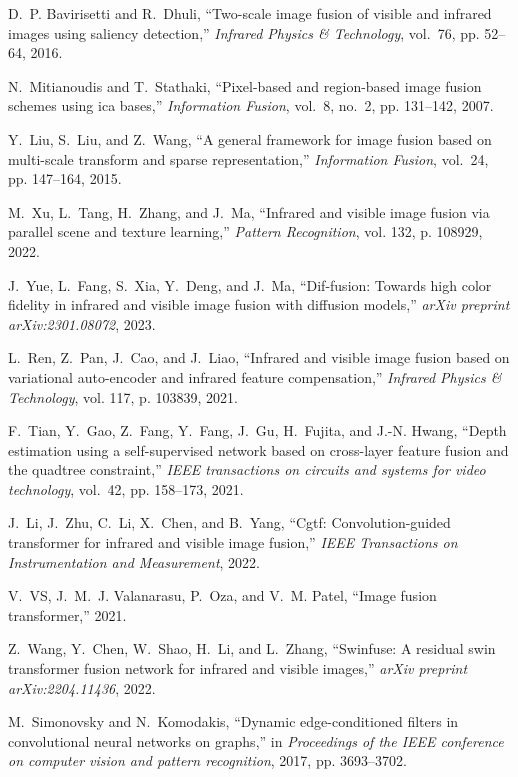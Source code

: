 \documentclass[journal]{IEEEtran}
\begin{document}
\begin{thebibliography}{10}
D.~P. Bavirisetti and R.~Dhuli, ``Two-scale image fusion of visible and
  infrared images using saliency detection,'' \emph{Infrared Physics \&
  Technology}, vol.~76, pp. 52--64, 2016.

N.~Mitianoudis and T.~Stathaki, ``Pixel-based and region-based image fusion
  schemes using ica bases,'' \emph{Information Fusion}, vol.~8, no.~2, pp.
  131--142, 2007.

Y.~Liu, S.~Liu, and Z.~Wang, ``A general framework for image fusion based on
  multi-scale transform and sparse representation,'' \emph{Information Fusion},
  vol.~24, pp. 147--164, 2015.

M.~Xu, L.~Tang, H.~Zhang, and J.~Ma, ``Infrared and visible image fusion via
  parallel scene and texture learning,'' \emph{Pattern Recognition}, vol. 132,
  p. 108929, 2022.

J.~Yue, L.~Fang, S.~Xia, Y.~Deng, and J.~Ma, ``Dif-fusion: Towards high color
  fidelity in infrared and visible image fusion with diffusion models,''
  \emph{arXiv preprint arXiv:2301.08072}, 2023.

L.~Ren, Z.~Pan, J.~Cao, and J.~Liao, ``Infrared and visible image fusion based
  on variational auto-encoder and infrared feature compensation,''
  \emph{Infrared Physics \& Technology}, vol. 117, p. 103839, 2021.

F.~Tian, Y.~Gao, Z.~Fang, Y.~Fang, J.~Gu, H.~Fujita, and J.-N. Hwang, ``Depth
  estimation using a self-supervised network based on cross-layer feature
  fusion and the quadtree constraint,'' \emph{IEEE transactions on circuits and
  systems for video technology}, vol.~42, pp. 158--173, 2021.

J.~Li, J.~Zhu, C.~Li, X.~Chen, and B.~Yang, ``Cgtf: Convolution-guided
  transformer for infrared and visible image fusion,'' \emph{IEEE Transactions
  on Instrumentation and Measurement}, 2022.

V.~VS, J.~M.~J. Valanarasu, P.~Oza, and V.~M. Patel, ``Image fusion
  transformer,'' 2021.

Z.~Wang, Y.~Chen, W.~Shao, H.~Li, and L.~Zhang, ``Swinfuse: A residual swin
  transformer fusion network for infrared and visible images,'' \emph{arXiv
  preprint arXiv:2204.11436}, 2022.

M.~Simonovsky and N.~Komodakis, ``Dynamic edge-conditioned filters in
  convolutional neural networks on graphs,'' in \emph{Proceedings of the IEEE
  conference on computer vision and pattern recognition}, 2017, pp. 3693--3702.


\end{thebibliography}
\end{document}
